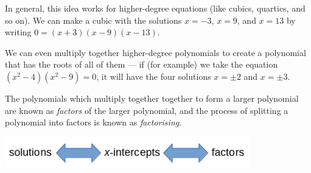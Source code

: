 \documentclass[a4paper,10pt,titlepage]{article}
\theoremstyle{definition}
\begin{document}
In general, this idea works for higher-degree equations (like cubics, quartics,
and so on). We can make a cubic with the solutions $ x = -3 $, $ x = 9 $, and
$ x = 13 $ by writing $ 0 = (x+3)(x-9)(x-13) $.

We can even multiply together higher-degree polynomials to create a polynomial
that has the roots of all of them --- if (for example) we take the equation
$ (x^2 - 4)(x^2 - 9) = 0 $, it will have the four solutions $ x = \pm 2 $ and $ x = \pm 3 $.

The polynomials which multiply together together to form a larger polynomial are known
as \textit{factors} of the larger polynomial, and the process of splitting a polynomial
into factors is known as \textit{factorising}.

\begin{center}
  \includegraphics[width=0.8\textwidth]{solutions-chrt}
\end{center}
\end{document}
